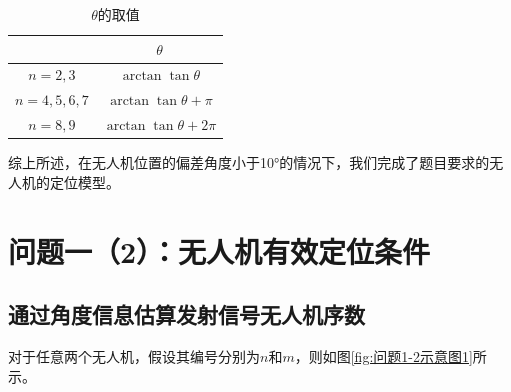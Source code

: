 \documentclass[12pt,AutoFakeSlant,AutoFakeBold]{article}
\begin{document}
\begin{table}[!ht]
    \centering
    \caption{$\theta$的取值}
    \label{tab:thetan取值}
    \begin{tabular}{cc}
        \toprule
        ~  &  $\theta$\\
        \midrule
        $n=2,3$ & $\arctan\tan\theta$\\
        $n=4,5,6,7$ & $\arctan\tan\theta + \pi$\\
        $n=8,9$ & $\arctan\tan\theta + 2\pi$\\
        \bottomrule
    \end{tabular}
\end{table}

综上所述，在无人机位置的偏差角度小于10°的情况下，我们完成了题目要求的无人机的定位模型。


\section{问题一（2）：无人机有效定位条件}

\subsection{通过角度信息估算发射信号无人机序数}

对于任意两个无人机，假设其编号分别为$n$和$m$，则如图\ref{fig:问题1-2示意图1}所示。
\end{document}
